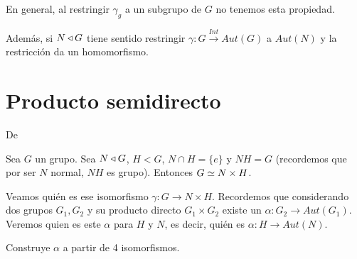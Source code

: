 En general, al restringir $\gamma_g$ a un subgrupo de $G$ no tenemos esta propiedad.

Además, si $N \mathbin{\triangleleft} G$ tiene sentido restringir $\gamma: G \xrightarrow{Int} Aut(G)$ a $Aut(N)$ y la restricción da un homomorfismo.

\section{Producto semidirecto}

De \cite{dor96}




Sea $G$ un grupo. Sea $N \mathbin{\triangleleft} G$, $H < G$, $N \cap H = \{e\}$ y $NH = G$ (recordemos que por ser $N$ normal, $NH$ es grupo). Entonces $G \simeq N \times H$.

Veamos quién es ese isomorfismo $\gamma : G \to N \times H$. Recordemos que considerando dos grupos $G_1, G_2$ y su producto directo $G_1 \times G_2$ existe un $\alpha : G_2 \to Aut(G_1)$. Veremos quien es este $\alpha$ para $H$ y $N$, es decir, quién es $\alpha: H \to Aut(N)$.

Construye $\alpha$ a partir de 4 isomorfismos.

